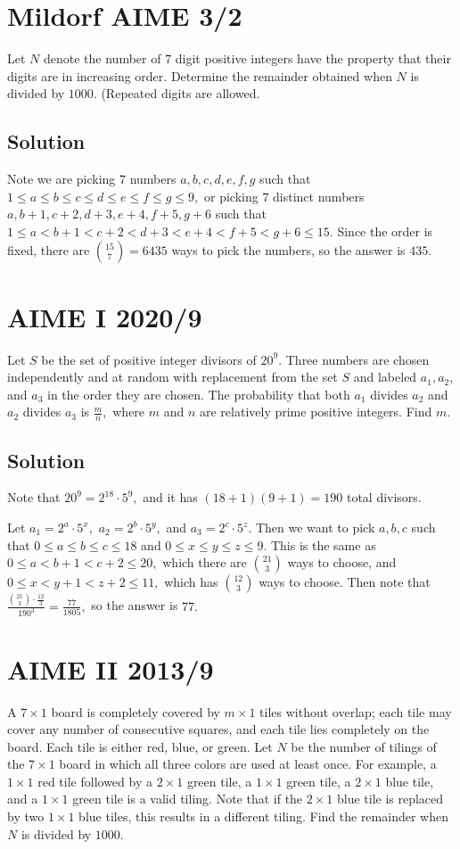 \documentclass{article}
\begin{document}
\pagebreak\section{Mildorf AIME 3/2}
Let $N$ denote the number of $7$ digit positive integers have the property that their digits are in increasing order. Determine the remainder obtained when $N$ is divided by $1000$. (Repeated digits are allowed.

\subsection{Solution}
Note we are picking $7$ numbers $a,b,c,d,e,f,g$ such that $1\leq a\leq b\leq c\leq d\leq e\leq f\leq g\leq 9,$ or picking $7$ distinct numbers $a,b+1,c+2,d+3,e+4,f+5,g+6$ such that $1\leq a< b+1< c+2< d+3< e+4< f+5< g+6\leq 15.$ Since the order is fixed, there are $\binom{15}{7}=6435$ ways to pick the numbers, so the answer is $435.$

\pagebreak\section{AIME I 2020/9}
Let $S$ be the set of positive integer divisors of $20^9.$ Three numbers are chosen independently and at random with replacement from the set $S$ and labeled $a_1,a_2,$ and $a_3$ in the order they are chosen. The probability that both $a_1$ divides $a_2$ and $a_2$ divides $a_3$ is $\tfrac{m}{n},$ where $m$ and $n$ are relatively prime positive integers. Find $m.$

\subsection{Solution}
Note that $20^9=2^{18}\cdot 5^9,$ and it has $(18+1)(9+1)=190$ total divisors.
    
Let $a_1=2^a\cdot 5^x,$ $a_2=2^b\cdot 5^y,$ and $a_3=2^c\cdot 5^z.$ Then we want to pick $a,b,c$ such that $0\leq a\leq b\leq c\leq 18$ and $0\leq x\leq y\leq z\leq 9.$ This is the same as $0\leq a<b+1<c+2\leq 20,$ which there are $\binom{21}{3}$ ways to choose, and $0\leq x<y+1<z+2\leq 11,$ which has $\binom{12}{3}$ ways to choose. Then note that $\frac{\binom{21}{3}\cdot\frac{12}{3}}{190^3}=\frac{77}{1805},$ so the answer is $77.$

\pagebreak\section{AIME II 2013/9}
A $7\times 1$ board is completely covered by $m\times 1$ tiles without overlap; each tile may cover any number of consecutive squares, and each tile lies completely on the board. Each tile is either red, blue, or green. Let $N$ be the number of tilings of the $7\times 1$ board in which all three colors are used at least once. For example, a $1\times 1$ red tile followed by a $2\times 1$ green tile, a $1\times 1$ green tile, a $2\times 1$ blue tile, and a $1\times 1$ green tile is a valid tiling. Note that if the $2\times 1$ blue tile is replaced by two $1\times 1$ blue tiles, this results in a different tiling. Find the remainder when $N$ is divided by $1000$.
\end{document}

